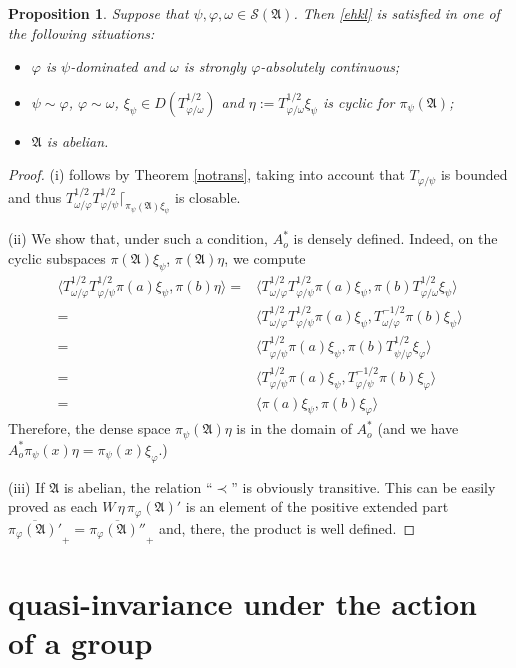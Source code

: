 \documentclass[12pt]{amsart}
\numberwithin{equation}{section}
\def\cs{{\mathcal S}}
\def\ga{{\mathfrak A}} \def\gpa{{\mathfrak a}}
\def\f{\varphi}\def\ff{\phi} \def\F{\Phi}
\def\om{\omega} \def\Om{\Omega}
\newtheorem{prop}[thm]{Proposition}
\begin{document}
\begin{prop}
\label{coidecz}
Suppose that $\psi,\f,\om\in\cs(\ga)$. Then \eqref{ehkl} is satisfied in one of the following situations:
\begin{itemize}
\item[(i)] $\f$ is $\psi$-dominated and $\om$ is strongly $\f$-absolutely continuous;
\item[(ii)] $\psi\sim\f$, $\f\sim\om$, $\xi_\psi\in D(T^{1/2}_{\f/\om})$ and $\eta:=T^{1/2}_{\f/\om}\xi_\psi$ is cyclic for $\pi_\psi(\ga)$;
\item[(iii)] $\ga$ is abelian.
\end{itemize}
\end{prop}
\begin{proof}
(i) follows by Theorem \ref{notrans}, taking into account that $T_{\f/\psi}$ is bounded and thus 
$T^{1/2}_{\om/\f}T^{1/2}_{\f/\psi}\lceil_{\pi_\psi(\ga)\xi_\psi}$ is closable.

(ii) We show that, under such a condition, $A_o^*$ is densely defined. Indeed, on the cyclic subspaces $\pi(\ga)\xi_\psi$, $\pi(\ga)\eta$, we compute
\begin{align*}
\langle T^{1/2}_{\om/\f}T^{1/2}_{\f/\psi}\pi(a)\xi_\psi,\pi(b)\eta\rangle
=&\langle T^{1/2}_{\om/\f}T^{1/2}_{\f/\psi}\pi(a)\xi_\psi,\pi(b)T^{1/2}_{\f/\om}\xi_\psi\rangle\\
=&\langle T^{1/2}_{\om/\f}T^{1/2}_{\f/\psi}\pi(a)\xi_\psi,T^{-1/2}_{\om/\f}\pi(b)\xi_\psi\rangle\\
=&\langle T^{1/2}_{\f/\psi}\pi(a)\xi_\psi,\pi(b)T^{1/2}_{\psi/\f}\xi_\f\rangle\\
=&\langle T^{1/2}_{\f/\psi}\pi(a)\xi_\psi,T^{-1/2}_{\f/\psi}\pi(b)\xi_\f\rangle\\
=&\langle \pi(a)\xi_\psi,\pi(b)\xi_\f\rangle
\end{align*}
Therefore, the dense space $\pi_\psi(\ga)\eta$ is in the domain of $A_o^*$ (and we have
$A_o^*\pi_\psi(x)\eta=\pi_\psi(x)\xi_\f$.)

(iii) If $\ga$ is abelian, the relation ``$\prec$'' is obviously transitive. This can be easily proved as 
each $W\,\eta\,\pi_\f(\ga)'$ is an element of the positive extended part
$\overline{\pi_\f(\ga)'}_+=\overline{\pi_\f(\ga)''}_+$
and, there, the product is well defined.
\end{proof}



\section{quasi-invariance under the action of a group}
\label{inupnkz}
\end{document}
